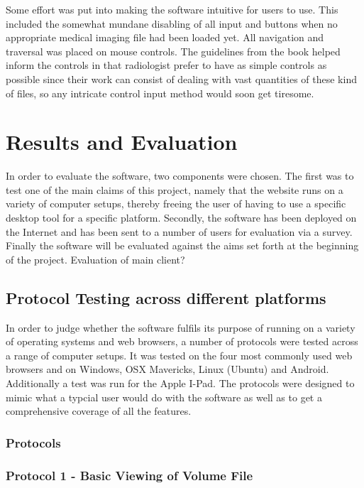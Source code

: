 \documentclass[a4paper,11pt,titlepage]{article}
\begin{document}
Some effort was put into making the software intuitive for users to use.
This included the somewhat mundane disabling of all input and buttons when no appropriate medical imaging file had been loaded yet.
All navigation and traversal was placed on mouse controls. The guidelines from the book helped inform the controls in that radiologist prefer to have as simple controls as possible since their work can consist of dealing with vast quantities of these kind of files, so any intricate control input method would soon get tiresome.



\section{Results and Evaluation}

In order to evaluate the software, two components were chosen. The first was to test one of the main claims of this project, namely that the website runs on a variety of computer setups, thereby freeing the user of having to use a specific desktop tool for a specific platform. Secondly, the software has been deployed on the Internet and has been sent to a number of users for evaluation via a survey. Finally the software will be evaluated against the aims set forth at the beginning of the project.
Evaluation of main client?


\subsection{Protocol Testing across different platforms}

In order to judge whether the software fulfils its purpose of running on a variety of operating systems and web browsers, a number of protocols were tested across a range of computer setups. It was tested on the four most commonly used web browsers and on Windows, OSX Mavericks, Linux (Ubuntu) and Android. Additionally a test was run for the Apple I-Pad. The protocols were designed to mimic what a typcial user would do with the software as well as to get a comprehensive coverage of all the features.


\subsubsection{Protocols}

\subsubsection*{Protocol 1 - Basic Viewing of Volume File }
\end{document}
